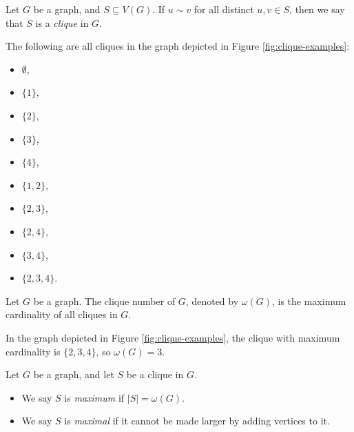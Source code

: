 \begin{defn}
    Let $G$ be a graph, and $S \subseteq V(G)$. If $u \sim v$ for all distinct $u, v \in S$, then we say that $S$ is a \emph{clique} in $G$.
\end{defn}

\begin{exmp}
    The following are all cliques in the graph depicted in Figure \ref{fig:clique-examples}:
    \begin{multicols}{2}
        \begin{itemize}
            \item $\emptyset$,
            \item $\{1\}$,
            \item $\{2\}$,
            \item $\{3\}$,
            \item $\{4\}$,
        \end{itemize}
        \columnbreak
        \begin{itemize}
            \item $\{1, 2\}$,
            \item $\{2, 3\}$,
            \item $\{2, 4\}$,
            \item $\{3, 4\}$,
            \item $\{2, 3, 4\}$.
        \end{itemize}
    \end{multicols}
\end{exmp}

\begin{defn}
    Let $G$ be a graph. The clique number of $G$, denoted by $\omega(G)$, is the maximum cardinality of all cliques in $G$.
\end{defn}

\begin{exmp}
    In the graph depicted in Figure \ref{fig:clique-examples}, the clique with maximum cardinality is $\{2, 3, 4\}$, so $\omega(G) = 3$.
\end{exmp}

\begin{defn}
    Let $G$ be a graph, and let $S$ be a clique in $G$.
    \begin{itemize}
        \item We say $S$ is \emph{maximum} if $|S| = \omega(G)$.
        \item We say $S$ is \emph{maximal} if it cannot be made larger by adding vertices to it.
    \end{itemize}
\end{defn}

